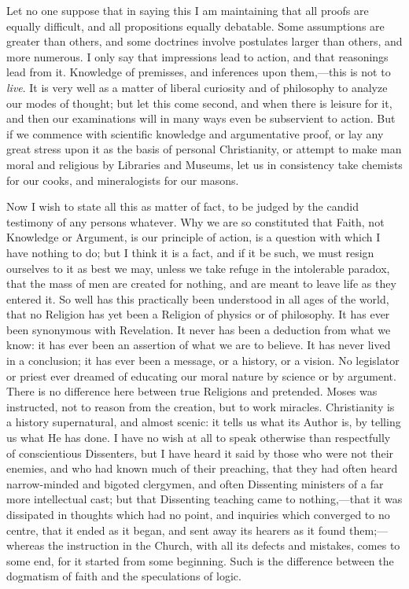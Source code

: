 Let no one suppose that in saying this I am maintaining that all
proofs are equally difficult, and all propositions equally debatable.
Some assumptions are greater than others, and some doctrines involve
postulates larger than others, and more numerous. I only say that
impressions lead to action, and that reasonings lead from it.
Knowledge of premisses, and inferences upon them,—this is not to \emph{live}.
It is very well as a matter of liberal curiosity and of philosophy to
analyze our modes of thought; but let this come second, and when there
is leisure for it, and then our examinations will in many ways even be
subservient to action. But if we commence with scientific knowledge
and argumentative proof, or lay any great stress upon it as the basis
of personal Christianity, or attempt to make man moral and
religious by Libraries and Museums, let us in consistency take
chemists for our cooks, and mineralogists for our masons.

Now I wish to state all this as matter of fact, to be judged by the
candid testimony of any persons whatever. Why we are so constituted
that Faith, not Knowledge or Argument, is our principle of action, is
a question with which I have nothing to do; but I think it is a fact,
and if it be such, we must resign ourselves to it as best we may,
unless we take refuge in the intolerable paradox, that the mass of men
are created for nothing, and are meant to leave life as they entered
it. So well has this practically been understood in all ages of the
world, that no Religion has yet been a Religion of physics or of
philosophy. It has ever been synonymous with Revelation. It never has
been a deduction from what we know: it has ever been an assertion of
what we are to believe. It has never lived in a conclusion; it has
ever been a message, or a history, or a vision. No legislator or
priest ever dreamed of educating our moral nature by science or by
argument. There is no difference here between true Religions and
pretended. Moses was instructed, not to reason from the creation, but
to work miracles. Christianity is a history supernatural, and almost
scenic: it tells us what its Author is, by telling us what He has
done. I have no wish at all to speak otherwise than respectfully of
conscientious Dissenters, but I have heard it said by those who were
not their enemies, and who had known much of their preaching, that
they had often heard narrow-minded and bigoted clergymen, and often
Dissenting ministers of a far more intellectual cast; but that
Dissenting teaching came to nothing,—that it was dissipated in
thoughts which had no point, and inquiries which converged to no
centre, that it ended as it began, and sent away its hearers as
it found them;—whereas the instruction in the Church, with all its
defects and mistakes, comes to some end, for it started from some
beginning. Such is the difference between the dogmatism of faith and
the speculations of logic.

